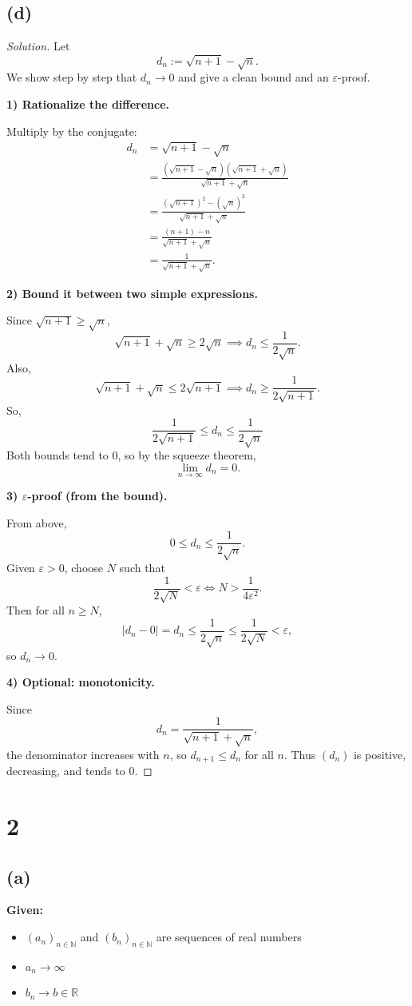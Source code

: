 \documentclass[12pt,a4paper]{article}
\theoremstyle{definition}
\theoremstyle{remark}
\newenvironment{solution}{\begin{proof}[Solution]}{\end{proof}}
\begin{document}
\subsection*{(d)}
\begin{solution}
Let
\[
d_n := \sqrt{n+1} - \sqrt{n}.
\]
We show step by step that $d_n \to 0$ and give a clean bound and an $\varepsilon$-proof.

\textbf{1) Rationalize the difference.}

Multiply by the conjugate:
\[
\begin{aligned}
d_n
&= \sqrt{n+1} - \sqrt{n} \\[2pt]
&= \frac{(\sqrt{n+1} - \sqrt{n})(\sqrt{n+1} + \sqrt{n})}{\sqrt{n+1} + \sqrt{n}} \\[2pt]
&= \frac{(\sqrt{n+1})^2 - (\sqrt{n})^2}{\sqrt{n+1} + \sqrt{n}} \\[2pt]
&= \frac{(n+1) - n}{\sqrt{n+1} + \sqrt{n}} \\[2pt]
&= \boxed{\frac{1}{\sqrt{n+1} + \sqrt{n}}}.
\end{aligned}
\]

\textbf{2) Bound it between two simple expressions.}

Since $\sqrt{n+1} \ge \sqrt{n}$,
\[
\sqrt{n+1} + \sqrt{n} \ge 2\sqrt{n}
\implies
d_n \le \frac{1}{2\sqrt{n}}.
\]
Also,
\[
\sqrt{n+1} + \sqrt{n} \le 2\sqrt{n+1}
\implies
d_n \ge \frac{1}{2\sqrt{n+1}}.
\]
So,
\[
\boxed{
\frac{1}{2\sqrt{n+1}} \le d_n \le \frac{1}{2\sqrt{n}}
}
\]
Both bounds tend to $0$, so by the squeeze theorem,
\[
\lim_{n\to\infty} d_n = 0.
\]

\textbf{3) $\varepsilon$-proof (from the bound).}

From above,
\[
0 \le d_n \le \frac{1}{2\sqrt{n}}.
\]
Given $\varepsilon > 0$, choose $N$ such that
\[
\frac{1}{2\sqrt{N}} < \varepsilon
\iff
N > \frac{1}{4\varepsilon^2}.
\]
Then for all $n \ge N$,
\[
|d_n - 0| = d_n \le \frac{1}{2\sqrt{n}} \le \frac{1}{2\sqrt{N}} < \varepsilon,
\]
so $d_n \to 0$.

\textbf{4) Optional: monotonicity.}

Since
\[
d_n = \frac{1}{\sqrt{n+1} + \sqrt{n}},
\]
the denominator increases with $n$, so $d_{n+1} \le d_n$ for all $n$. Thus $(d_n)$ is positive, decreasing, and tends to $0$.
\end{solution}

\section*{2}
\subsection*{(a)}
\textbf{Given:} 
\begin{itemize}
    \item $(a_n)_{n\in\mathbb{N}}$ and $(b_n)_{n\in\mathbb{N}}$ are sequences of real numbers
    \item $a_n \to \infty$
    \item $b_n \to b \in \mathbb{R}$
\end{itemize}
\end{document}
